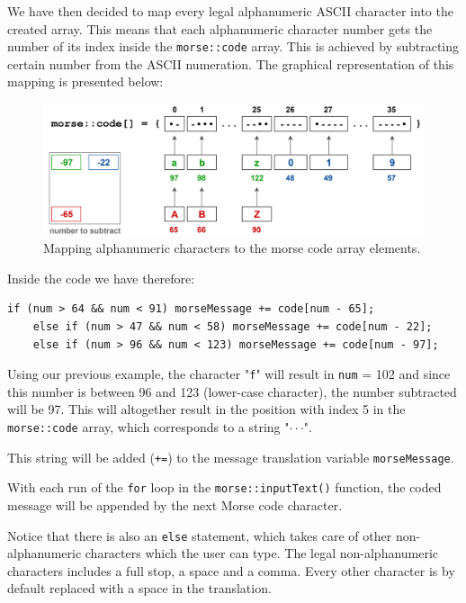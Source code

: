 \documentclass[12pt]{report}
\begin{document}
We have then decided to map every legal alphanumeric ASCII character into the created array. This means that each alphanumeric character number gets the number of its index inside the \verb|morse::code| array. This is achieved by subtracting certain number from the ASCII numeration. The graphical representation of this mapping is presented below:

\begin{figure}[H]
\centering\includegraphics[scale=0.1]{morse_code_map}
\caption{Mapping alphanumeric characters to the morse code array elements.}				
\label{fig:morse_code_map}
\end{figure}

Inside the code we have therefore:

\begin{lstlisting}
if (num > 64 && num < 91) morseMessage += code[num - 65];
	else if (num > 47 && num < 58) morseMessage += code[num - 22];
	else if (num > 96 && num < 123) morseMessage += code[num - 97];
\end{lstlisting}

Using our previous example, the character "\verb|f|" will result in \verb|num| = 102 and since this number is between 96 and 123 (lower-case character), the number subtracted will be 97. This will altogether result in the position with index 5 in the \verb|morse::code| array, which corresponds to a string "$\cdot\cdot$\text{-}$\cdot$". 

This string will be added (\verb|+=|) to the message translation variable \verb|morseMessage|.

With each run of the \verb|for| loop in the \verb|morse::inputText()| function, the coded message will be appended by the next Morse code character.

Notice that there is also an \verb|else| statement, which takes care of other non-alphanumeric characters which the user can type. The legal non-alphanumeric characters includes a full stop, a space and a comma. Every other character is by default replaced with a space in the translation.
\end{document}
